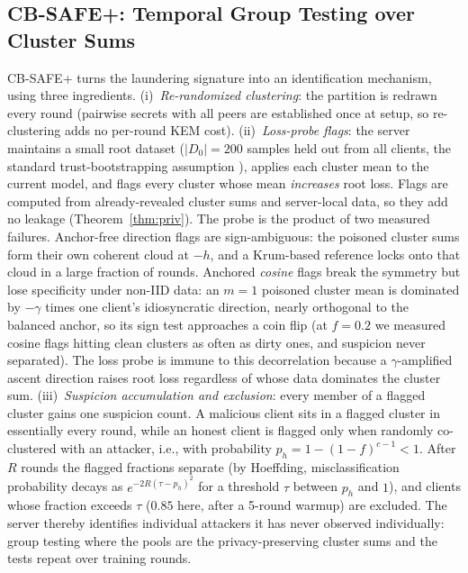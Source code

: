 \documentclass[conference]{IEEEtran}
\begin{document}
\subsection{CB-SAFE+: Temporal Group Testing over Cluster Sums}\label{sec:defense}
CB-SAFE+ turns the laundering signature into an identification mechanism, using
three ingredients. (i)~\emph{Re-randomized clustering}: the partition is redrawn
every round (pairwise secrets with all peers are established once at setup, so
re-clustering adds no per-round KEM cost). (ii)~\emph{Loss-probe flags}: the
server maintains a small root dataset ($|D_0|{=}200$ samples held out from all
clients, the standard trust-bootstrapping assumption \cite{fltrust,zeno}), applies
each cluster mean to the current model, and flags every cluster whose mean
\emph{increases} root loss. Flags are computed from already-revealed cluster sums
and server-local data, so they add no leakage (Theorem~\ref{thm:priv}). The probe is
the product of two measured failures. Anchor-free direction flags are
sign-ambiguous: the poisoned cluster sums form their own coherent cloud at $-h$, and
a Krum-based reference locks onto that cloud in a large fraction of rounds.
Anchored \emph{cosine} flags break the symmetry but lose specificity under non-IID
data: an $m{=}1$ poisoned cluster mean is dominated by $-\gamma$ times one client's
idiosyncratic direction, nearly orthogonal to the balanced anchor, so its sign test
approaches a coin flip (at $f{=}0.2$ we measured cosine flags hitting clean clusters
as often as dirty ones, and suspicion never separated). The loss probe is immune to
this decorrelation because a $\gamma$-amplified ascent direction raises root loss
regardless of whose data dominates the cluster sum. (iii)~\emph{Suspicion accumulation and exclusion}: every member of a flagged
cluster gains one suspicion count. A malicious client sits in a flagged cluster in
essentially every round, while an honest client is flagged only when randomly
co-clustered with an attacker, i.e., with probability $p_h = 1-(1-f)^{c-1} < 1$.
After $R$ rounds the flagged fractions separate (by Hoeffding, misclassification
probability decays as $e^{-2R(\tau - p_h)^2}$ for a threshold $\tau$ between $p_h$
and $1$), and clients whose fraction exceeds $\tau$ ($0.85$ here, after a 5-round
warmup) are excluded. The server thereby identifies individual attackers it has
never observed individually: group testing where the pools are the
privacy-preserving cluster sums and the tests repeat over training rounds.
\end{document}
